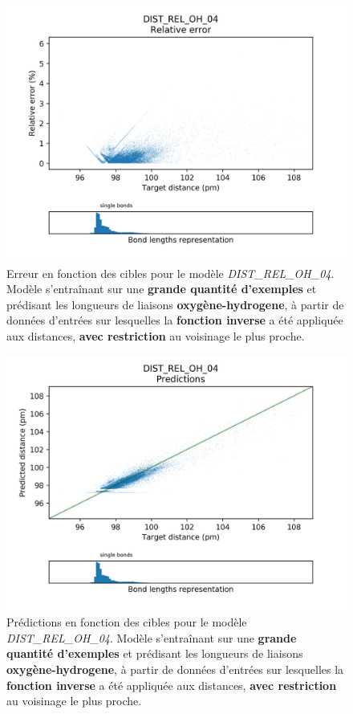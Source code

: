 \begin{figure}[!h]
	\centering
	
	\includegraphics[scale=0.75]{../figures/DIST_REL_OH_04/DIST_REL_OH_04_distrib_rmse_dist.png}	
	
	\caption{Erreur en fonction des cibles pour le modèle \emph{DIST\_REL\_OH\_04}. Modèle s'entraînant sur une \textbf{grande quantité d'exemples} et prédisant les longueurs de liaisons \textbf{oxygène-hydrogene}, à partir de données d'entrées sur lesquelles la \textbf{fonction inverse} a été appliquée aux distances, \textbf{avec restriction} au voisinage le plus proche.}
\end{figure}

\begin{figure}[!h]
	\centering
	
	\includegraphics[scale=0.75]{../figures/DIST_REL_OH_04/DIST_REL_OH_04_preds_targets.png}	
	
	\caption{Prédictions en fonction des cibles pour le modèle \emph{DIST\_REL\_OH\_04}. Modèle s'entraînant sur une \textbf{grande quantité d'exemples} et prédisant les longueurs de liaisons \textbf{oxygène-hydrogene}, à partir de données d'entrées sur lesquelles la \textbf{fonction inverse} a été appliquée aux distances, \textbf{avec restriction} au voisinage le plus proche.}
	
\end{figure}

